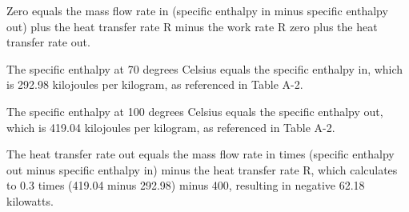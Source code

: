 Zero equals the mass flow rate in (specific enthalpy in minus specific enthalpy out) plus the heat transfer rate R minus the work rate R zero plus the heat transfer rate out.

The specific enthalpy at 70 degrees Celsius equals the specific enthalpy in, which is 292.98 kilojoules per kilogram, as referenced in Table A-2.

The specific enthalpy at 100 degrees Celsius equals the specific enthalpy out, which is 419.04 kilojoules per kilogram, as referenced in Table A-2.

The heat transfer rate out equals the mass flow rate in times (specific enthalpy out minus specific enthalpy in) minus the heat transfer rate R, which calculates to 0.3 times (419.04 minus 292.98) minus 400, resulting in negative 62.18 kilowatts.